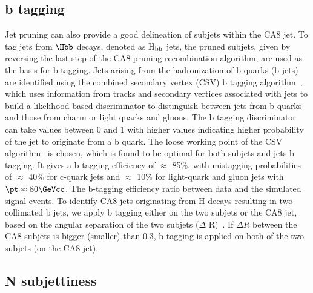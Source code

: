 \subsection{b tagging}
Jet pruning can also provide a good delineation of subjets within the CA8 jet.
To tag jets from $\Hbb$ decays, denoted as ${\rm H_{bb}}$ jets, the pruned subjets, 
given by reversing the last step of the CA8 pruning recombination algorithm,  
are used as the basis for b tagging.
Jets arising from the hadronization of b quarks (b jets) are identified using the combined 
secondary vertex (CSV) b tagging algorithm~\cite{CSVBtagging}, which uses information from tracks and 
secondary vertices associated with jets to build a likelihood-based discriminator to distinguish
between jets from b quarks and those from charm or light quarks and gluons. The b tagging
discriminator can take values between 0 and 1 with higher values indicating higher probability
of the jet to originate from a b quark. 
The loose working point of the CSV algorithm~\cite{CSVBtagging} is chosen,
which is found to be optimal for both subjets and jets b tagging.  
It gives a b-tagging efficiency of $\approx$ 85\%,  
with mistagging probabilities of $\approx$ 40\% for 
c-quark jets and $\approx$ 10\% for light-quark and 
gluon jets with
 $\pt\approx 80\GeVcc$. The b-tagging efficiency ratio between data and
the simulated signal events. To identify CA8 jets originating 
from H decays resulting in two collimated b jets, 
we apply b tagging 
either on the two subjets or the
CA8 jet, based on the angular separation of the
 two subjets ($\Delta $ R)~\cite{BTV-13-001}.
If $\Delta R$ between the CA8 subjets is bigger (smaller) than 0.3, 
b tagging is applied on both of the two subjets (on the CA8 jet). 




\subsection{N subjettiness}

